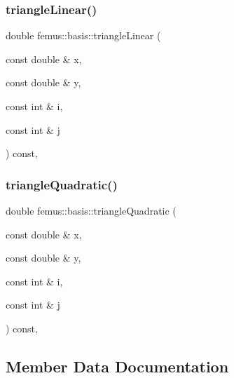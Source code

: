 \mbox{\label{classfemus_1_1basis_ae1b0f968c69a125b1437c86691b79659}} 
\subsubsection{\texorpdfstring{triangle\+Linear()}{triangleLinear()}}
{\footnotesize\ttfamily double femus\+::basis\+::triangle\+Linear (\begin{DoxyParamCaption}\item[{const double \&}]{x,  }\item[{const double \&}]{y,  }\item[{const int \&}]{i,  }\item[{const int \&}]{j }\end{DoxyParamCaption}) const\hspace{0.3cm}{\ttfamily [inline]}, {\ttfamily [protected]}}

\mbox{\label{classfemus_1_1basis_ae42b607d5f23bdf072243ee3db496a44}} 
\subsubsection{\texorpdfstring{triangle\+Quadratic()}{triangleQuadratic()}}
{\footnotesize\ttfamily double femus\+::basis\+::triangle\+Quadratic (\begin{DoxyParamCaption}\item[{const double \&}]{x,  }\item[{const double \&}]{y,  }\item[{const int \&}]{i,  }\item[{const int \&}]{j }\end{DoxyParamCaption}) const\hspace{0.3cm}{\ttfamily [inline]}, {\ttfamily [protected]}}



\subsection{Member Data Documentation}
\mbox{\label{classfemus_1_1basis_a8beaeb66f172e318e6f4daa22af0ee29}} 
